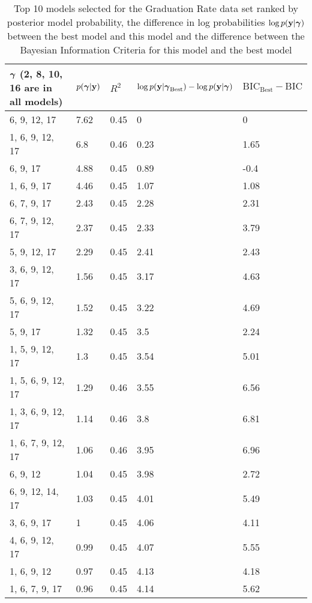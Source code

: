 \documentclass{amsart}
\begin{document}
\begin{table}
\label{tab:numerical_results_gradrate}
\caption{Top 10 models selected for the Graduation Rate data set ranked by posterior model probability, the
					difference in log probabilities $\log p({\bf y}|{\boldsymbol \gamma})$ between the best model and this model and the difference between the Bayesian Information Criteria for this model and the best model}
\begin{tabular}{|l|llll|}
\hline
${\boldsymbol \gamma}$ (2, 8, 10, 16 are in all models) & $p({\boldsymbol \gamma}|{\bf y})$ & $R^2$ & $\log p({\bf y} | {\boldsymbol \gamma}_\text{Best}) - \log p({\bf y} | {\boldsymbol \gamma})$ & $\text{BIC}_\text{Best} - \text{BIC}$ \\
\hline
6, 9, 12, 17&  7.62&  0.45&  0&  0\\
1, 6, 9, 12, 17&  6.8&  0.46&  0.23&  1.65\\
6, 9, 17&  4.88&  0.45&  0.89&  -0.4\\
1, 6, 9, 17&  4.46&  0.45&  1.07&  1.08\\
6, 7, 9, 17&  2.43&  0.45&  2.28&  2.31\\
6, 7, 9, 12, 17&  2.37&  0.45&  2.33&  3.79\\
5, 9, 12, 17&  2.29&  0.45&  2.41&  2.43\\
3, 6, 9, 12, 17&  1.56&  0.45&  3.17&  4.63\\
5, 6, 9, 12, 17&  1.52&  0.45&  3.22&  4.69\\
5, 9, 17&  1.32&  0.45&  3.5&  2.24\\
1, 5, 9, 12, 17&  1.3&  0.45&  3.54&  5.01\\
1, 5, 6, 9, 12, 17&  1.29&  0.46&  3.55&  6.56\\
1, 3, 6, 9, 12, 17&  1.14&  0.46&  3.8&  6.81\\
1, 6, 7, 9, 12, 17&  1.06&  0.46&  3.95&  6.96\\
6, 9, 12&  1.04&  0.45&  3.98&  2.72\\
6, 9, 12, 14, 17&  1.03&  0.45&  4.01&  5.49\\
3, 6, 9, 17&  1&  0.45&  4.06&  4.11\\
4, 6, 9, 12, 17&  0.99&  0.45&  4.07&  5.55\\
1, 6, 9, 12&  0.97&  0.45&  4.13&  4.18\\
1, 6, 7, 9, 17&  0.96&  0.45&  4.14&  5.62\\
\hline
\end{tabular}
\end{table}
\end{document}
